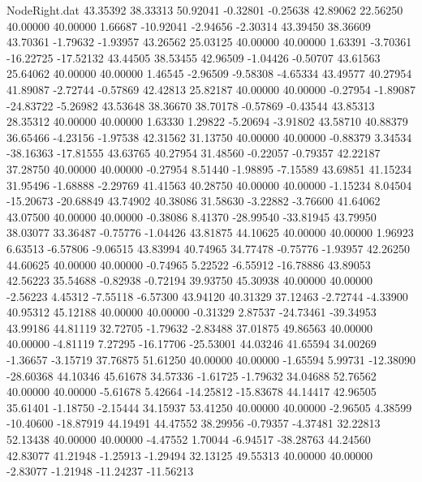 \begin{filecontents}{NodeRight.dat}
  43.35392   38.33313   50.92041    -0.32801   -0.25638   42.89062   22.56250   40.00000   40.00000    1.66687  -10.92041   -2.94656   -2.30314
  43.39450   38.36609   43.70361    -1.79632   -1.93957   43.26562   25.03125   40.00000   40.00000    1.63391   -3.70361  -16.22725  -17.52132
  43.44505   38.53455   42.96509    -1.04426   -0.50707   43.61563   25.64062   40.00000   40.00000    1.46545   -2.96509   -9.58308   -4.65334
  43.49577   40.27954   41.89087    -2.72744   -0.57869   42.42813   25.82187   40.00000   40.00000   -0.27954   -1.89087  -24.83722   -5.26982
  43.53648   38.36670   38.70178    -0.57869   -0.43544   43.85313   28.35312   40.00000   40.00000    1.63330    1.29822   -5.20694   -3.91802
  43.58710   40.88379   36.65466    -4.23156   -1.97538   42.31562   31.13750   40.00000   40.00000   -0.88379    3.34534  -38.16363  -17.81555
  43.63765   40.27954   31.48560    -0.22057   -0.79357   42.22187   37.28750   40.00000   40.00000   -0.27954    8.51440   -1.98895   -7.15589
  43.69851   41.15234   31.95496    -1.68888   -2.29769   41.41563   40.28750   40.00000   40.00000   -1.15234    8.04504  -15.20673  -20.68849
  43.74902   40.38086   31.58630    -3.22882   -3.76600   41.64062   43.07500   40.00000   40.00000   -0.38086    8.41370  -28.99540  -33.81945
  43.79950   38.03077   33.36487    -0.75776   -1.04426   43.81875   44.10625   40.00000   40.00000    1.96923    6.63513   -6.57806   -9.06515
  43.83994   40.74965   34.77478    -0.75776   -1.93957   42.26250   44.60625   40.00000   40.00000   -0.74965    5.22522   -6.55912  -16.78886
  43.89053   42.56223   35.54688    -0.82938   -0.72194   39.93750   45.30938   40.00000   40.00000   -2.56223    4.45312   -7.55118   -6.57300
  43.94120   40.31329   37.12463    -2.72744   -4.33900   40.95312   45.12188   40.00000   40.00000   -0.31329    2.87537  -24.73461  -39.34953
  43.99186   44.81119   32.72705    -1.79632   -2.83488   37.01875   49.86563   40.00000   40.00000   -4.81119    7.27295  -16.17706  -25.53001
  44.03246   41.65594   34.00269    -1.36657   -3.15719   37.76875   51.61250   40.00000   40.00000   -1.65594    5.99731  -12.38090  -28.60368
  44.10346   45.61678   34.57336    -1.61725   -1.79632   34.04688   52.76562   40.00000   40.00000   -5.61678    5.42664  -14.25812  -15.83678
  44.14417   42.96505   35.61401    -1.18750   -2.15444   34.15937   53.41250   40.00000   40.00000   -2.96505    4.38599  -10.40600  -18.87919
  44.19491   44.47552   38.29956    -0.79357   -4.37481   32.22813   52.13438   40.00000   40.00000   -4.47552    1.70044   -6.94517  -38.28763
  44.24560   42.83077   41.21948    -1.25913   -1.29494   32.13125   49.55313   40.00000   40.00000   -2.83077   -1.21948  -11.24237  -11.56213

\end{filecontents}
